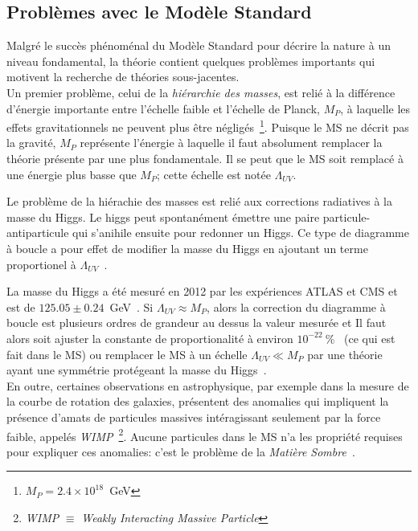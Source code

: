 
\subsection{Problèmes avec le Modèle Standard}
\label{sec:ms:problemes}

Malgré le succès phénoménal du Modèle Standard pour décrire la nature
à un niveau fondamental, la théorie contient quelques problèmes
importants qui motivent la recherche de théories sous-jacentes. \\

Un premier problème, celui de la \emph{hiérarchie des masses}, est
relié à la différence d'énergie importante entre l'échelle faible et
l'échelle de Planck, $M_P$, à laquelle les effets gravitationnels ne
peuvent plus être négligés~\footnote{$M_P = 2.4 \times 10^{18}$~GeV}. Puisque le MS ne décrit pas la gravité,
$M_P$ représente l'énergie à laquelle il faut absolument remplacer la
théorie présente par une plus fondamentale. Il se peut que le MS soit
remplacé à une énergie plus basse que $M_P$; cette échelle est notée $\Lambda_{UV}$.

Le problème de la hiérachie des masses est relié aux corrections
radiatives à la masse du Higgs. Le higgs peut spontanément émettre une
paire particule-antiparticule qui s'anihile ensuite pour redonner un
Higgs. Ce type de diagramme à boucle a pour effet de modifier la masse
du Higgs en ajoutant un terme proportionel à $\Lambda_{UV}$~\cite{martin_supersymmetry_1997}.

La masse du Higgs a été mesuré en 2012 par les expériences ATLAS et
CMS et est de
$125.05 \pm 0.24$~GeV~\cite{atlas_collaboration_combined_2015}. Si
$\Lambda_{UV} \approx M_P$, alors la correction du diagramme à boucle
est plusieurs ordres de grandeur au dessus la valeur mesurée et Il
faut alors soit ajuster la constante de proportionalité à environ
$10^{-22}~\%$~\cite{giudice_naturally_20087} (ce qui est fait dans le
MS) ou remplacer le MS à un échelle $\Lambda_{UV} \ll M_P$ par une
théorie ayant une symmétrie protégeant la masse du
Higgs~\cite{martin_supersymmetry_1997}. \\

En outre, certaines observations en astrophysique, par exemple dans la
mesure de la courbe de rotation des galaxies, présentent des anomalies
qui impliquent la présence d'amats de particules massives
intéragissant seulement par la force faible, appelés
\emph{WIMP}~\footnote{\emph{WIMP} $\equiv$ \emph{Weakly Interacting
    Massive Particle}}. Aucune particules dans le MS n'a les propriété
requises pour expliquer ces anomalies: c'est le problème de la
\emph{Matière Sombre}~\cite{bertone_particle_2005}. \\

